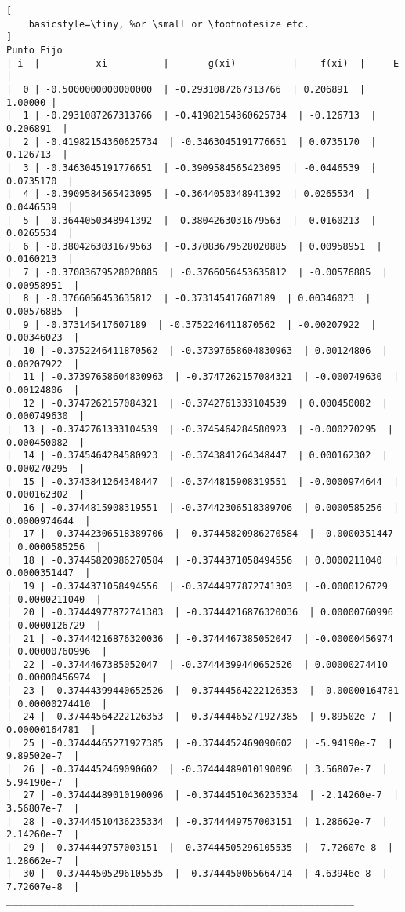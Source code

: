 \documentclass{article}
\begin{document}
\begin{lstlisting}[
    basicstyle=\tiny, %or \small or \footnotesize etc.
]
Punto Fijo
| i  |          xi          |       g(xi)          |    f(xi)  |     E   |
|  0 | -0.5000000000000000  | -0.2931087267313766  | 0.206891  | 1.00000 |    
|  1 | -0.2931087267313766  | -0.41982154360625734  | -0.126713  | 0.206891  |    
|  2 | -0.41982154360625734  | -0.3463045191776651  | 0.0735170  | 0.126713  |    
|  3 | -0.3463045191776651  | -0.3909584565423095  | -0.0446539  | 0.0735170  |    
|  4 | -0.3909584565423095  | -0.3644050348941392  | 0.0265534  | 0.0446539  |    
|  5 | -0.3644050348941392  | -0.3804263031679563  | -0.0160213  | 0.0265534  |    
|  6 | -0.3804263031679563  | -0.37083679528020885  | 0.00958951  | 0.0160213  |    
|  7 | -0.37083679528020885  | -0.3766056453635812  | -0.00576885  | 0.00958951  |    
|  8 | -0.3766056453635812  | -0.373145417607189  | 0.00346023  | 0.00576885  |    
|  9 | -0.373145417607189  | -0.3752246411870562  | -0.00207922  | 0.00346023  |    
|  10 | -0.3752246411870562  | -0.37397658604830963  | 0.00124806  | 0.00207922  |    
|  11 | -0.37397658604830963  | -0.3747262157084321  | -0.000749630  | 0.00124806  |    
|  12 | -0.3747262157084321  | -0.3742761333104539  | 0.000450082  | 0.000749630  |    
|  13 | -0.3742761333104539  | -0.3745464284580923  | -0.000270295  | 0.000450082  |    
|  14 | -0.3745464284580923  | -0.3743841264348447  | 0.000162302  | 0.000270295  |    
|  15 | -0.3743841264348447  | -0.3744815908319551  | -0.0000974644  | 0.000162302  |    
|  16 | -0.3744815908319551  | -0.37442306518389706  | 0.0000585256  | 0.0000974644  |    
|  17 | -0.37442306518389706  | -0.37445820986270584  | -0.0000351447  | 0.0000585256  |    
|  18 | -0.37445820986270584  | -0.3744371058494556  | 0.0000211040  | 0.0000351447  |    
|  19 | -0.3744371058494556  | -0.37444977872741303  | -0.0000126729  | 0.0000211040  |
|  20 | -0.37444977872741303  | -0.37444216876320036  | 0.00000760996  | 0.0000126729  |    
|  21 | -0.37444216876320036  | -0.3744467385052047  | -0.00000456974  | 0.00000760996  |    
|  22 | -0.3744467385052047  | -0.37444399440652526  | 0.00000274410  | 0.00000456974  |    
|  23 | -0.37444399440652526  | -0.37444564222126353  | -0.00000164781  | 0.00000274410  |    
|  24 | -0.37444564222126353  | -0.37444465271927385  | 9.89502e-7  | 0.00000164781  |    
|  25 | -0.37444465271927385  | -0.3744452469090602  | -5.94190e-7  | 9.89502e-7  |    
|  26 | -0.3744452469090602  | -0.37444489010190096  | 3.56807e-7  | 5.94190e-7  |    
|  27 | -0.37444489010190096  | -0.37444510436235334  | -2.14260e-7  | 3.56807e-7  |    
|  28 | -0.37444510436235334  | -0.3744449757003151  | 1.28662e-7  | 2.14260e-7  |
|  29 | -0.3744449757003151  | -0.37444505296105535  | -7.72607e-8  | 1.28662e-7  |    
|  30 | -0.37444505296105535  | -0.3744450065664714  | 4.63946e-8  | 7.72607e-8  |
______________________________________________________________


\end{lstlisting}
\end{document}
